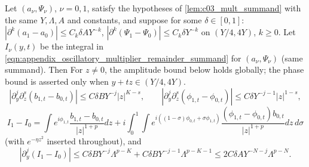 \begin{lemma}
  \label{lem:c03_mult_difference}
  Let $(a_\nu,\Psi_\nu)$, $\nu=0,1$, satisfy the hypotheses of \cref{lem:c03_mult_summand} with the same $Y,\Lambda,A$ and constants, and suppose for some $\delta\in[0,1]$:
  $|\partial^k(a_1-a_0)|\le C_k\delta AY^{-k}$, $|\partial^k(\Psi_1-\Psi_0)|\le C_k\delta Y^{-k}$ on $(Y/4,4Y)$, $k\ge0$. Let $I_\nu(y,t)$ be the integral in \eqref{eqn:appendix_oscillatory_multiplier_remainder_summand} for $(a_\nu,\Psi_\nu)$ (same summand). Then
  For $z\ne0$, the amplitude bound below holds globally; the phase bound is asserted only when $y+tz\in(Y/4,4Y)$.
  \begin{equation}\label{eqn:appendix_oscillatory_multiplier_difference_symbols}
    |\partial_y^j\partial_z^s(b_{1,t}-b_{0,t})|\le C\delta BY^{-j}|z|^{K-s},\qquad
    |\partial_y^j\partial_z^s(\phi_{1,t}-\phi_{0,t})|\le C\delta Y^{-j-1}|z|^{1-s},
  \end{equation}
  \begin{equation}\label{eqn:appendix_oscillatory_multiplier_difference_integrals}
    I_1-I_0=\int e^{i\phi_{1,t}}\frac{b_{1,t}-b_{0,t}}{|z|^{1+p}}dz+i\int_0^1\!\!\int e^{i((1-\sigma)\phi_{0,t}+\sigma\phi_{1,t})}\frac{(\phi_{1,t}-\phi_{0,t})b_{0,t}}{|z|^{1+p}}dz\,d\sigma
  \end{equation}
  (with $e^{-\eta z^2}$ inserted throughout), and
  \begin{equation}\label{eqn:appendix_oscillatory_multiplier_difference_summand}
    |\partial_y^j(I_1-I_0)|\le C\delta BY^{-j}\Lambda^{p-K}+C\delta BY^{-j-1}\Lambda^{p-K-1}\le 2C\delta AY^{-N-j}\Lambda^{p-N}.
  \end{equation}
\end{lemma}

